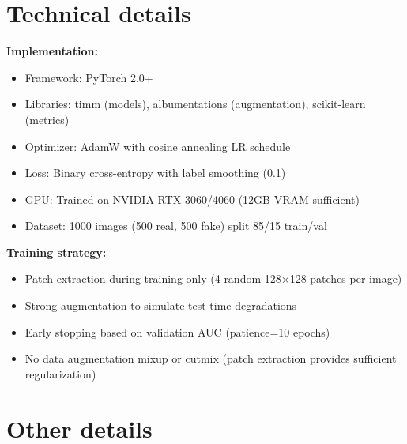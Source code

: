 \documentclass{article}
\begin{document}
\begin{table}[htb]
    \centering
    \caption{Method specification}
    \label{tab:methodinfos}
\end{table}

\section{Technical details}

\textbf{Implementation:}
\begin{itemize}
    \item Framework: PyTorch 2.0+
    \item Libraries: timm (models), albumentations (augmentation), scikit-learn (metrics)
    \item Optimizer: AdamW with cosine annealing LR schedule
    \item Loss: Binary cross-entropy with label smoothing (0.1)
    \item GPU: Trained on NVIDIA RTX 3060/4060 (12GB VRAM sufficient)
    \item Dataset: 1000 images (500 real, 500 fake) split 85/15 train/val
\end{itemize}

\textbf{Training strategy:}
\begin{itemize}
    \item Patch extraction during training only (4 random 128×128 patches per image)
    \item Strong augmentation to simulate test-time degradations
    \item Early stopping based on validation AUC (patience=10 epochs)
    \item No data augmentation mixup or cutmix (patch extraction provides sufficient regularization)
\end{itemize}

\section{Other details}
\end{document}
